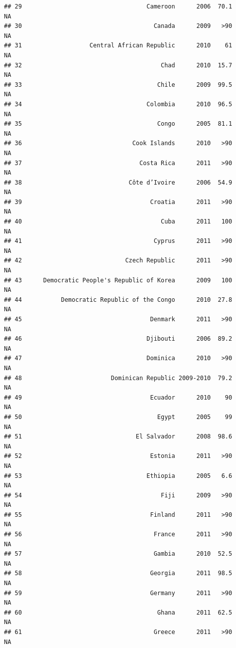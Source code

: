 \documentclass[
]{book}
\begin{document}
\begin{verbatim}
## 29                                   Cameroon      2006  70.1              NA
## 30                                     Canada      2009   >90              NA
## 31                   Central African Republic      2010    61              NA
## 32                                       Chad      2010  15.7              NA
## 33                                      Chile      2009  99.5              NA
## 34                                   Colombia      2010  96.5              NA
## 35                                      Congo      2005  81.1              NA
## 36                               Cook Islands      2010   >90              NA
## 37                                 Costa Rica      2011   >90              NA
## 38                              Côte d’Ivoire      2006  54.9              NA
## 39                                    Croatia      2011   >90              NA
## 40                                       Cuba      2011   100              NA
## 41                                     Cyprus      2011   >90              NA
## 42                             Czech Republic      2011   >90              NA
## 43      Democratic People's Republic of Korea      2009   100              NA
## 44           Democratic Republic of the Congo      2010  27.8              NA
## 45                                    Denmark      2011   >90              NA
## 46                                   Djibouti      2006  89.2              NA
## 47                                   Dominica      2010   >90              NA
## 48                         Dominican Republic 2009-2010  79.2              NA
## 49                                    Ecuador      2010    90              NA
## 50                                      Egypt      2005    99              NA
## 51                                El Salvador      2008  98.6              NA
## 52                                    Estonia      2011   >90              NA
## 53                                   Ethiopia      2005   6.6              NA
## 54                                       Fiji      2009   >90              NA
## 55                                    Finland      2011   >90              NA
## 56                                     France      2011   >90              NA
## 57                                     Gambia      2010  52.5              NA
## 58                                    Georgia      2011  98.5              NA
## 59                                    Germany      2011   >90              NA
## 60                                      Ghana      2011  62.5              NA
## 61                                     Greece      2011   >90              NA

\end{verbatim}
\end{document}
